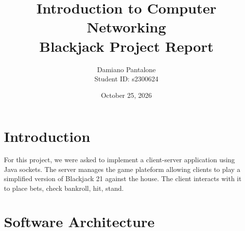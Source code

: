 \documentclass[11pt]{article}
\title{Introduction to Computer Networking\\Blackjack Project Report}
\author{Damiano Pantalone \\ Student ID: s2300624}
\date{October 25, 2026}
\begin{document}
\maketitle

\section{Introduction}
For this project, we were asked to implement a client-server application using Java sockets. The server manages the game plateform allowing clients to play a simplified version of Blackjack 21 against the house.
The client interacts with it to place bets, check bankroll, hit, stand.

\section{Software Architecture}
\end{document}
